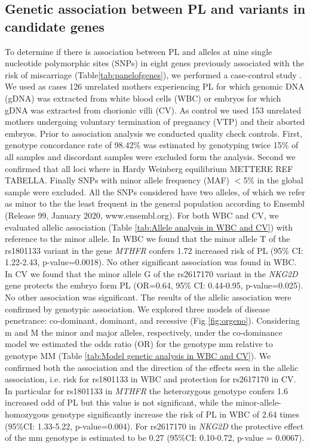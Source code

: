 \documentclass[10pt,letterpaper]{article}
\begin{document}
\subsection*{Genetic association between PL and variants in candidate genes}
To determine if there is association between PL and alleles at nine single nucleotide polymorphic sites (SNPs) in eight genes previously associated with the risk of miscarriage (Table\ref{tab:panelofgenes}), we performed a case-control study \cite{clarke2011basic}. We used as cases 126 unrelated mothers experiencing PL for which genomic DNA (gDNA) was extracted from white blood cells (WBC) or embryos for which gDNA was extracted from chorionic villi (CV). As control we used 153 unrelated mothers undergoing voluntary termination of pregnancy (VTP) and their aborted embryos. Prior to association analysis we conducted quality check controls. First, genotype concordance rate of 98.42\% was estimated by genotyping twice 15\% of all samples and discordant samples were excluded form the analysis. Second we confirmed that all loci where in Hardy Weinberg equilibrium METTERE REF TABELLA. Finally SNPs with minor allele frequency (MAF) $<$5\% in the global sample were excluded. 
\noindent All the SNPs considered have two alleles, of which we refer as minor to the the least frequent in the general population according to Ensembl (Release 99, January 2020, www.ensembl.org).
\noindent For both WBC and CV, we evaluated allelic association (Table \ref{tab:Allele analysis in WBC and CV}) with reference to the minor allele. In WBC we found that the minor allele T of the rs1801133 variant in the gene \textit{MTHFR} confers 1.72 increased risk of PL (95\% CI: 1.22-2.43, p-value=0.0018). No other significant association was found in WBC. In CV we found that the minor allele G of the rs2617170 variant in the \textit{NKG2D} gene protects the embryo form PL (OR=0.64, 95\% CI: 0.44-0.95, p-value=0.025). No other association was significant.
\noindent The results of the allelic association were confirmed by genotypic association. We explored three models of disease penetrance: co-dominant, dominant, and recessive (Fig \ref{fig:orgeno}). Considering m and M the minor and major alleles, respectively, under the co-dominance model we estimated the odds ratio (OR) for the genotype mm relative to genotype MM (Table \ref{tab:Model genetic analysis in WBC and CV}). We confirmed both the association and the direction of the effects seen in the allelic association, i.e. risk for rs1801133 in WBC and protection for rs2617170 in CV. In particular for rs1801133 in \textit{MTHFR} the heterozygous genotype confers 1.6 increased odd of PL but this value is not significant, while the minor-allele-homozygous genotype significantly increase the risk of PL in WBC of 2.64 times (95\%CI: 1.33-5.22, p-value=0.004). For rs2617170 in \textit{NKG2D} the protective effect of the mm genotype is estimated to be 0.27 (95\%CI: 0.10-0.72, p-value = 0.0067). 
\end{document}
